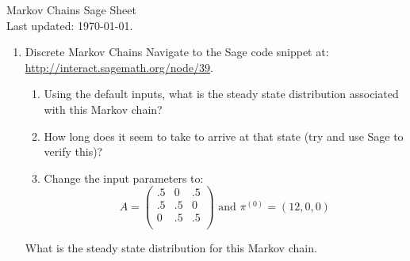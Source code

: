 \documentclass[12pt]{article}
\begin{document}
\begin{center}
\Huge{Markov Chains Sage Sheet}\\
\tiny{Last updated: \today.}
\end{center}

\begin{enumerate}
\item Discrete Markov Chains
Navigate to the Sage code snippet at: \url{http://interact.sagemath.org/node/39}.
\begin{enumerate}
\item Using the default inputs, what is the steady state distribution associated with this Markov chain?
\item How long does it seem to take to arrive at that state (try and use Sage to verify this)?
\item Change the input parameters to:
$$A=\begin{pmatrix}
.5&0&.5\\
.5&.5&0\\
0&.5&.5\\
\end{pmatrix}\text{ and }\pi^{(0)}=(12,0,0)$$
\end{enumerate}
What is the steady state distribution for this Markov chain.
\end{enumerate}
\end{document}
